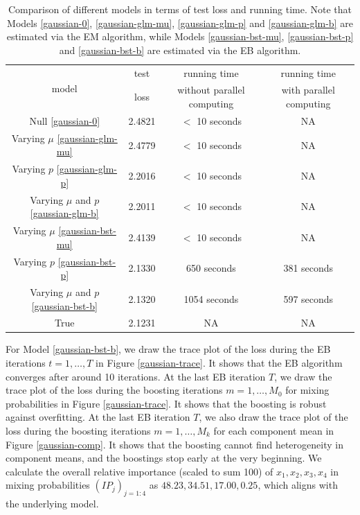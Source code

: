\documentclass[11pt]{article}
\numberwithin{equation}{section}
\begin{document}
\begin{table}[htp!]
	\caption{Comparison of different models in terms of test loss and running time. Note that Models \eqref{gaussian-0}, \eqref{gaussian-glm-mu}, \eqref{gaussian-glm-p} and \eqref{gaussian-glm-b} are estimated via the EM algorithm, while Models \eqref{gaussian-bst-mu}, \eqref{gaussian-bst-p} and \eqref{gaussian-bst-b} are estimated via the EB algorithm.}\label{gaussian-summary}
	\centering
	\begin{tabular}{c|ccc}
		\hline
		\multirow{2}{*}{model} & test       & running time               & running time            \\
		& loss & without parallel computing & with parallel computing \\ \hline
		Null \eqref{gaussian-0}                   & 2.4821         & $<$ 10 seconds       & NA    \\
		Varying $\mu$	\eqref{gaussian-glm-mu}                & 2.4779         & $<$ 10 seconds       & NA    \\
		Varying  $p$ \eqref{gaussian-glm-p}                 & 2.2016         & $<$ 10 seconds       & NA   \\
		Varying $\mu$ and $p$ \eqref{gaussian-glm-b}              & 2.2011         & $<$ 10 seconds       & NA   \\
		\hline
		Varying $\mu$ \eqref{gaussian-bst-mu}                & 2.4139         & $<$ 10 seconds       & NA    \\
		Varying $p$ \eqref{gaussian-bst-p}                 & 2.1330          &            650 seconds                & 381 seconds           \\
		Varying $\mu$ and $p$ \eqref{gaussian-bst-b}              & 2.1320          &              1054 seconds              & 597 seconds               \\
		\hline
		True                   & 2.1231         &            NA                &               NA         \\ \hline
	\end{tabular}
\end{table}

For Model \eqref{gaussian-bst-b}, we draw the trace plot of the loss during the EB iterations $t=1,\ldots,T$ in Figure \ref{gaussian-trace}.
It shows that the EB algorithm converges after around 10 iterations. 
At the last EB iteration $T$, we draw the trace plot of the loss during the boosting iterations $m=1,\ldots,M_0$ for mixing probabilities in Figure \ref{gaussian-trace}.
It shows that the boosting is robust against overfitting.
At the last EB iteration $T$, we also draw the trace plot of the loss during the boosting iterations $m=1,\ldots,M_k$ for each component mean in Figure \ref{gaussian-comp}.
It shows that the boosting cannot find heterogeneity in component means, and the boostings stop early at the very beginning. 
We calculate the overall relative importance (scaled to sum 100) of $x_1,x_2,x_3,x_4$ in mixing probabilities $(IP_j)_{j=1:4}$ as $48.23,34.51,17.00,0.25$, which aligns with the underlying model.
\end{document}
